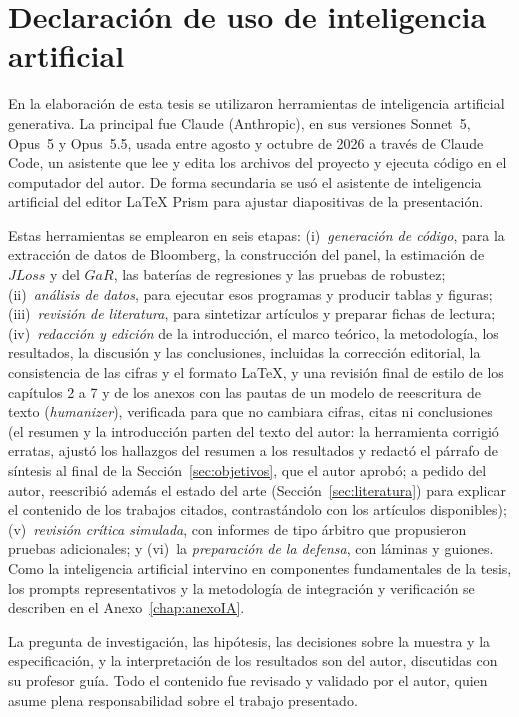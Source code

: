 \chapter*{Declaración de uso de inteligencia artificial}

En la elaboración de esta tesis se utilizaron herramientas de inteligencia artificial generativa. La principal fue Claude (Anthropic), en sus versiones Sonnet~5, Opus~5 y Opus~5.5, usada entre agosto y octubre de 2026 a través de Claude Code, un asistente que lee y edita los archivos del proyecto y ejecuta código en el computador del autor. De forma secundaria se usó el asistente de inteligencia artificial del editor \LaTeX{} Prism para ajustar diapositivas de la presentación.

Estas herramientas se emplearon en seis etapas: (i)~\emph{generación de código}, para la extracción de datos de Bloomberg, la construcción del panel, la estimación de $JLoss$ y del $GaR$, las baterías de regresiones y las pruebas de robustez; (ii)~\emph{análisis de datos}, para ejecutar esos programas y producir tablas y figuras; (iii)~\emph{revisión de literatura}, para sintetizar artículos y preparar fichas de lectura; (iv)~\emph{redacción y edición} de la introducción, el marco teórico, la metodología, los resultados, la discusión y las conclusiones, incluidas la corrección editorial, la consistencia de las cifras y el formato \LaTeX, y una revisión final de estilo de los capítulos 2 a 7 y de los anexos con las pautas de un modelo de reescritura de texto (\textit{humanizer}), verificada para que no cambiara cifras, citas ni conclusiones (el resumen y la introducción parten del texto del autor: la herramienta corrigió erratas, ajustó los hallazgos del resumen a los resultados y redactó el párrafo de síntesis al final de la Sección~\ref{sec:objetivos}, que el autor aprobó; a pedido del autor, reescribió además el estado del arte (Sección~\ref{sec:literatura}) para explicar el contenido de los trabajos citados, contrastándolo con los artículos disponibles); (v)~\emph{revisión crítica simulada}, con informes de tipo árbitro que propusieron pruebas adicionales; y (vi)~la \emph{preparación de la defensa}, con láminas y guiones. Como la inteligencia artificial intervino en componentes fundamentales de la tesis, los prompts representativos y la metodología de integración y verificación se describen en el Anexo~\ref{chap:anexoIA}.

La pregunta de investigación, las hipótesis, las decisiones sobre la muestra y la especificación, y la interpretación de los resultados son del autor, discutidas con su profesor guía. Todo el contenido fue revisado y validado por el autor, quien asume plena responsabilidad sobre el trabajo presentado.
